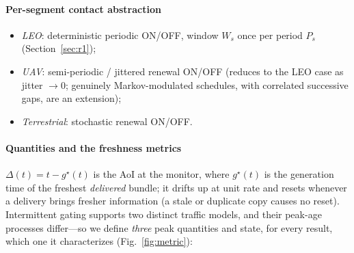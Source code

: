 \documentclass[twocolumn,3p,times,procedia]{elsarticle}
\newcommand{\AoI}{\Delta}
\begin{document}
\paragraph*{Per-segment contact abstraction}
\begin{itemize}
\item \emph{LEO}: deterministic periodic ON/OFF, window $W_s$ once per
period $P_s$ (Section~\ref{sec:r1});
\item \emph{UAV}: semi-periodic / jittered renewal ON/OFF (reduces to
the LEO case as jitter $\to 0$; genuinely Markov-modulated schedules,
with correlated successive gaps, are an extension);
\item \emph{Terrestrial}: stochastic renewal ON/OFF.
\end{itemize}

\paragraph*{Quantities and the freshness metrics}
$\AoI(t)=t-g^{\star}(t)$ is the AoI at the monitor, where $g^{\star}(t)$
is the generation time of the freshest \emph{delivered} bundle; it drifts
up at unit rate and resets whenever a delivery brings fresher
information (a stale or duplicate copy causes no reset). Intermittent
gating supports two distinct traffic models, and their peak-age
processes differ---so we define \emph{three} peak quantities and state,
for every result, which one it characterizes
(Fig.~\ref{fig:metric}):
\end{document}
